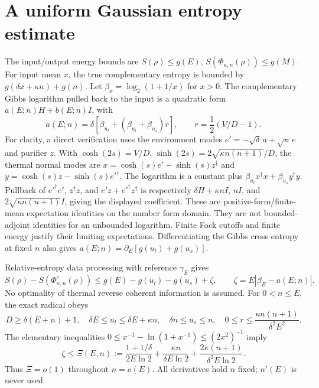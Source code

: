 \documentclass[11pt]{article}
\newcommand{\PhiT}{\Phi_{\kappa,n}}
\begin{document}
\section{A uniform Gaussian entropy estimate}
The input/output energy bounds are
\(S(\rho)\le g(E)\), \(S(\PhiT(\rho))\le g(M)\).
For input mean \(x\), the true complementary entropy is bounded by
\(g(\delta x+\kappa n)+g(n)\).
Let \(\beta_x=\log_2(1+1/x)\) for \(x>0\).
The complementary Gibbs logarithm pulled back to the input is a
quadratic form \(a(E;n)H+b(E;n)I\), with
\[
 a(E;n)=\delta\left[\beta_{u_l}
           +(\beta_{u_l}+\beta_{u_s})r\right],
 \qquad r=\frac12(V/D-1).
 \label{eq:a}
\]
For clarity, a direct verification uses the environment modes
\(e'=-\sqrt\delta\,a+\sqrt\kappa\,e\) and purifier \(z\).
With \(\cosh(2s)=V/D\), \(\sinh(2s)=2\sqrt{\kappa n(n+1)}/D\),
the thermal normal modes are
\(x=\cosh(s)e'-\sinh(s)z^\dagger\) and
\(y=\cosh(s)z-\sinh(s)e'^\dagger\).
The logarithm is a constant plus
\(\beta_{u_l}x^\dagger x+\beta_{u_s}y^\dagger y\).
Pullback of \(e'^\dagger e'\), \(z^\dagger z\), and
\(e'z+e'^\dagger z^\dagger\) is respectively
\(\delta H+\kappa nI\), \(nI\), and
\(2\sqrt{\kappa n(n+1)}I\), giving the displayed coefficient.
These are positive-form/finite-mean expectation identities on the number
form domain. They are not bounded-adjoint identities for an unbounded
logarithm. Finite Fock cutoffs and finite energy justify their limiting
expectations. Differentiating the Gibbs cross entropy at fixed \(n\)
also gives \(a(E;n)=\partial_E[g(u_l)+g(u_s)]\).

Relative-entropy data processing with reference \(\gamma_E\) gives
\[
 S(\rho)-S(\PhiT^c(\rho))
 \le g(E)-g(u_l)-g(u_s)+\zeta,\qquad
 \zeta=E|\beta_E-a(E;n)|.
 \tag{1}
\]
No optimality of thermal reverse coherent information is assumed.
For \(0<n\le E\), the exact radical obeys
\[
 D\ge\delta(E+n)+1,\quad
 \delta E\le u_l\le\delta E+\kappa n,\quad
 \delta n\le u_s\le n,\quad
 0\le r\le\frac{\kappa n(n+1)}{\delta^2E^2}.
\]
The elementary inequalities
\(0\le x^{-1}-\ln(1+x^{-1})\le(2x^2)^{-1}\) imply
\[
 \zeta\le\Xi(E,n):=
 \frac{1+1/\delta}{2E\ln2}
 +\frac{\kappa n}{\delta E\ln2}
 +\frac{2\kappa(n+1)}{\delta^2E\ln2}.
 \tag{2}
\]
Thus \(\Xi=o(1)\) throughout \(n=o(E)\).
All derivatives hold \(n\) fixed; \(n'(E)\) is never used.
\end{document}
